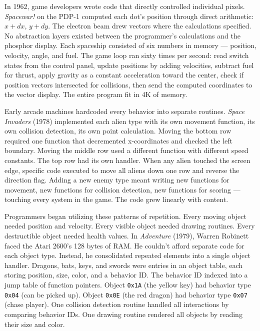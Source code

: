 In 1962, game developers wrote code that directly controlled individual pixels. \emph{Spacewar!} on the PDP-1 computed each dot's position through direct arithmetic: $x + dx$, $y + dy$. The electron beam drew vectors where the calculations specified. No abstraction layers existed between the programmer's calculations and the phosphor display. Each spaceship consisted of six numbers in memory — position, velocity, angle, and fuel. The game loop ran sixty times per second: read switch states from the control panel, update positions by adding velocities, subtract fuel for thrust, apply gravity as a constant acceleration toward the center, check if position vectors intersected for collisions, then send the computed coordinates to the vector display. The entire program fit in 4K of memory.

Early arcade machines hardcoded every behavior into separate routines. \emph{Space Invaders} (1978) implemented each alien type with its own movement function, its own collision detection, its own point calculation. Moving the bottom row required one function that decremented x-coordinates and checked the left boundary. Moving the middle row used a different function with different speed constants. The top row had its own handler. When any alien touched the screen edge, specific code executed to move all aliens down one row and reverse the direction flag. Adding a new enemy type meant writing new functions for movement, new functions for collision detection, new functions for scoring — touching every system in the game. The code grew linearly with content.

Programmers began utilizing these patterns of repetition. Every moving object needed position and velocity. Every visible object needed drawing routines. Every destructible object needed health values. In \emph{Adventure} (1979), Warren Robinett faced the Atari 2600's 128 bytes of RAM. He couldn't afford separate code for each object type. Instead, he consolidated repeated elements into a single object handler. Dragons, bats, keys, and swords were entries in an object table, each storing position, size, color, and a behavior ID. The behavior ID indexed into a jump table of function pointers. Object \texttt{0x1A} (the yellow key) had behavior type \texttt{0x04} (can be picked up). Object \texttt{0x0E} (the red dragon) had behavior type \texttt{0x07} (chase player). One collision detection routine handled all interactions by comparing behavior IDs. One drawing routine rendered all objects by reading their size and color. 

